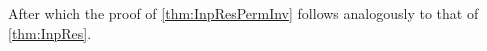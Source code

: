 





After which the proof of \cref{thm:InpResPermInv} follows analogously to that of \cref{thm:InpRes}.










